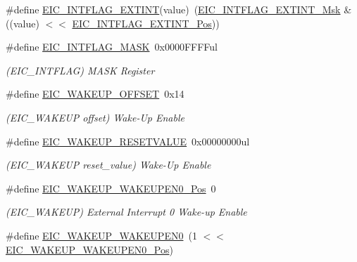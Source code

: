 \begin{DoxyCompactItemize}
\item 
\#define \mbox{\hyperlink{group___s_a_m_d21___e_i_c_ga9be0394a7b0f0deed1340527b6485f5c}{E\+I\+C\+\_\+\+I\+N\+T\+F\+L\+A\+G\+\_\+\+E\+X\+T\+I\+NT}}(value)~(\mbox{\hyperlink{group___s_a_m_d21___e_i_c_gae66d3b315a5d706346ec79d4e8348b2e}{E\+I\+C\+\_\+\+I\+N\+T\+F\+L\+A\+G\+\_\+\+E\+X\+T\+I\+N\+T\+\_\+\+Msk}} \& ((value) $<$$<$ \mbox{\hyperlink{group___s_a_m_d21___e_i_c_gadcbc791cf87b0cbd60e76f1958249501}{E\+I\+C\+\_\+\+I\+N\+T\+F\+L\+A\+G\+\_\+\+E\+X\+T\+I\+N\+T\+\_\+\+Pos}}))
\item 
\#define \mbox{\hyperlink{group___s_a_m_d21___e_i_c_ga81b4c53bcfec0717a26cde921d364062}{E\+I\+C\+\_\+\+I\+N\+T\+F\+L\+A\+G\+\_\+\+M\+A\+SK}}~0x0000\+F\+F\+F\+Ful
\begin{DoxyCompactList}\small\item\em (E\+I\+C\+\_\+\+I\+N\+T\+F\+L\+AG) M\+A\+SK Register \end{DoxyCompactList}\item 
\#define \mbox{\hyperlink{group___s_a_m_d21___e_i_c_gac0631d7a5f41ab67669c129c0e6daeb9}{E\+I\+C\+\_\+\+W\+A\+K\+E\+U\+P\+\_\+\+O\+F\+F\+S\+ET}}~0x14
\begin{DoxyCompactList}\small\item\em (E\+I\+C\+\_\+\+W\+A\+K\+E\+UP offset) Wake-\/\+Up Enable \end{DoxyCompactList}\item 
\#define \mbox{\hyperlink{group___s_a_m_d21___e_i_c_ga41805c4be5d18516c7b466f2872d8169}{E\+I\+C\+\_\+\+W\+A\+K\+E\+U\+P\+\_\+\+R\+E\+S\+E\+T\+V\+A\+L\+UE}}~0x00000000ul
\begin{DoxyCompactList}\small\item\em (E\+I\+C\+\_\+\+W\+A\+K\+E\+UP reset\+\_\+value) Wake-\/\+Up Enable \end{DoxyCompactList}\item 
\#define \mbox{\hyperlink{group___s_a_m_d21___e_i_c_ga09cc498c639a1fc66ac0c7fefcc9904a}{E\+I\+C\+\_\+\+W\+A\+K\+E\+U\+P\+\_\+\+W\+A\+K\+E\+U\+P\+E\+N0\+\_\+\+Pos}}~0
\begin{DoxyCompactList}\small\item\em (E\+I\+C\+\_\+\+W\+A\+K\+E\+UP) External Interrupt 0 Wake-\/up Enable \end{DoxyCompactList}\item 
\#define \mbox{\hyperlink{group___s_a_m_d21___e_i_c_ga86cac9aaa54491aeaa74c64d6b7e9028}{E\+I\+C\+\_\+\+W\+A\+K\+E\+U\+P\+\_\+\+W\+A\+K\+E\+U\+P\+E\+N0}}~(1 $<$$<$ \mbox{\hyperlink{group___s_a_m_d21___e_i_c_ga09cc498c639a1fc66ac0c7fefcc9904a}{E\+I\+C\+\_\+\+W\+A\+K\+E\+U\+P\+\_\+\+W\+A\+K\+E\+U\+P\+E\+N0\+\_\+\+Pos}})

\end{DoxyCompactItemize}
